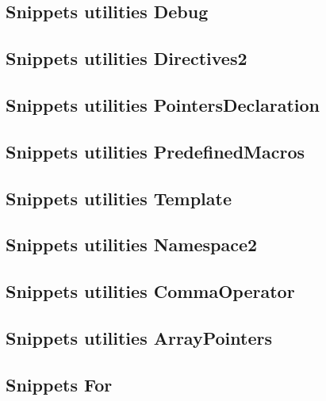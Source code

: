 \subsection{Snippets utilities Debug}
\raggedbottom
\hrulefill
\subsection{Snippets utilities Directives2}
\raggedbottom
\hrulefill
\subsection{Snippets utilities PointersDeclaration}
\raggedbottom
\hrulefill
\subsection{Snippets utilities PredefinedMacros}
\raggedbottom
\hrulefill
\subsection{Snippets utilities Template}
\raggedbottom
\hrulefill
\subsection{Snippets utilities Namespace2}
\raggedbottom
\hrulefill
\subsection{Snippets utilities CommaOperator}
\raggedbottom
\hrulefill
\subsection{Snippets utilities ArrayPointers}
\raggedbottom
\hrulefill
\subsection{Snippets For}
\raggedbottom
\hrulefill
